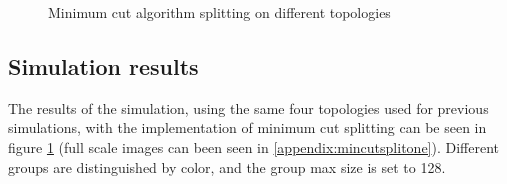 \begin{figure}
	\centering
		\qquad
		\qquad

		\qquad
		\qquad	
		\caption{Minimum cut algorithm splitting on different topologies}%
		\label{fig:mincutresults}%
\end{figure}


\subsection{Simulation results}
The results of the simulation, using the same four topologies used for previous simulations, with the implementation of minimum cut splitting can be seen in figure \ref{fig:mincutresults} (full scale images can been seen in \ref{appendix:mincutsplitone}). Different groups are distinguished by color, and the group max size is set to 128. 

